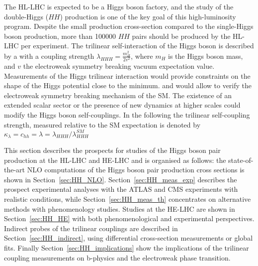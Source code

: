 \documentclass[../report.tex]{subfiles}
\begin{document}
\label{sec3}

The HL-LHC is expected to be a Higgs boson factory, and the study of the double-Higgs ($HH$) production is one of the key goal of this high-luminosity program. Despite the small production cross-section compared to the single-Higgs boson production, more than 100000 $HH$ pairs should be produced by the HL-LHC per experiment. The trilinear self-interaction of the Higgs boson is described by a with a coupling strength $\lambda_{HHH}  = \frac{m_H^2}{2v^2} $, where $m_H$ is the Higgs boson mass, and $v$ the electroweak symmetry breaking vacuum expectation value. Measurements of the Higgs trilinear interaction would provide constraints on the shape of the Higgs potential close to the minimum. and would allow to verify the electroweak symmetry breaking mechanism of the SM.
The existence of an extended scalar sector or the presence of new dynamics at higher scales could modify the Higgs boson self-couplings.
In the following the trilinear self-coupling strength, measured relative to the SM expectation is denoted by $\kappa_{\lambda} = c_{hh} = \lambda = \lambda_{HHH}/\lambda_{HHH}^{SM}$

This section describes the prospects for studies of the Higgs boson pair production at the HL-LHC and HE-LHC and is organised as follows: the state-of-the-art NLO computations of the Higgs boson pair production cross sections is shown in Section~\ref{sec:HH_NLO}. Section~\ref{sec:HH_meas_exp} describes the prospect experimental analyses with the ATLAS and CMS experiments with realistic conditions, while Section~\ref{sec:HH_meas_th} concentrates on alternative methods with phenomenology studies. Studies at the HE-LHC are shown in Section~\ref{sec:HH_HE} with both phenomenological and experimental perspectives. Indirect probes of the trilinear couplings are described in Section~\ref{sec:HH_indirect}, using differential cross-section measurements or global fits. Finally Section~\ref{sec:HH_implications} show the implications of the trilinear coupling measurements on b-physics and the electroweak phase transition.  

\label{sec:HH_NLO}





\end{document}
